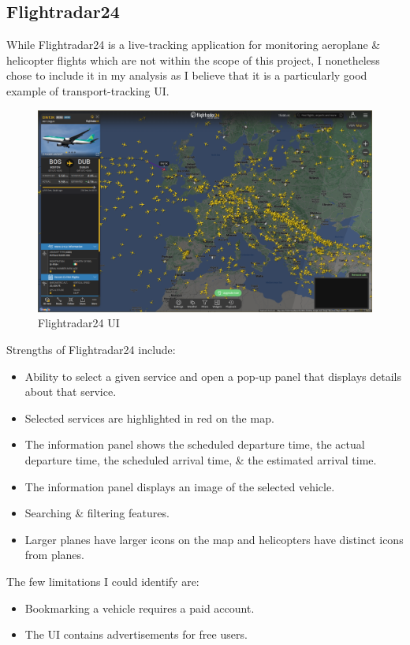 \documentclass[a4paper,11pt]{article}
\begin{document}
\subsection{Flightradar24}
While Flightradar24\supercite{radar} is a live-tracking application for monitoring aeroplane \& helicopter flights which are not within the scope of this project, I nonetheless chose to include it in my analysis as I believe that it is a particularly good example of transport-tracking UI.

\begin{figure}[H]
    \centering
    \includegraphics[width=\textwidth]{./images/flightradar.png}
    \caption{Flightradar24 UI}
\end{figure}

Strengths of Flightradar24 include:
\begin{itemize}
    \item   Ability to select a given service and open a pop-up panel that displays details about that service.
    \item   Selected services are highlighted in red on the map.
    \item   The information panel shows the scheduled departure time, the actual departure time, the scheduled arrival time, \& the estimated arrival time.
    \item   The information panel displays an image of the selected vehicle.
    \item   Searching \& filtering features.
    \item   Larger planes have larger icons on the map and helicopters have distinct icons from planes.
\end{itemize}

The few limitations I could identify are:
\begin{itemize}
    \item   Bookmarking a vehicle requires a paid account.
    \item   The UI contains advertisements for free users.
\end{itemize}
\end{document}
